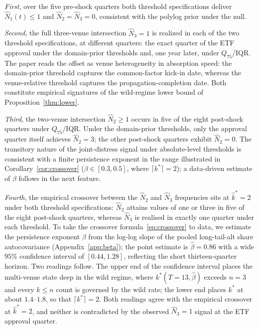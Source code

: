 \documentclass[12pt]{article}
\theoremstyle{sampledef}
\theoremstyle{sampleplain}
\theoremstyle{sampleremark}
\newcommand{\1}{\mathbf{1}}
\begin{document}
\emph{First}, over the five pre-shock quarters both threshold
specifications deliver $\hat N_1(t) \le 1$ and $\hat N_2 = \hat N_3
= 0$, consistent with the polylog prior under the null.

\emph{Second}, the full three-venue intersection $\hat N_3 = 1$ is
realized in each of the two threshold specifications, at different
quarters: the exact quarter of the ETF approval under the
domain-prior thresholds and, one year later, under $Q_{75}$/IQR.
The paper reads the offset as venue heterogeneity in absorption
speed: the domain-prior threshold captures the common-factor
kick-in date, whereas the venue-relative threshold captures the
propagation-completion date. Both constitute empirical signatures
of the wild-regime lower bound of Proposition~\ref{thm:lower}.

\emph{Third}, the two-venue intersection $\hat N_2 \ge 1$ occurs in
five of the eight post-shock quarters under $Q_{75}$/IQR. Under the
domain-prior thresholds, only the approval quarter itself achieves
$\hat N_2 = 3$; the other post-shock quarters exhibit
$\hat N_2 = 0$. The transitory nature of the joint-distress signal
under absolute-level thresholds is consistent with a
finite persistence exponent in the range illustrated in
Corollary~\ref{cor:crossover} ($\beta \in [0.3, 0.5]$, where
$\lceil k^\ast\rceil = 2$); a data-driven estimate of $\beta$
follows in the next feature.

\emph{Fourth}, the empirical crossover between the $\hat N_2$ and
$\hat N_3$ frequencies sits at $\hat k^\ast = 2$ under both
threshold specifications: $\hat N_2$ attains values of one or three
in five of the eight post-shock quarters, whereas $\hat N_3$ is realised
in exactly one quarter under each threshold. To take the crossover
formula~\eqref{eq:crossover} to data, we estimate the persistence
exponent $\beta$ from the log-log slope of the pooled long-tail-alt
share autocovariance (Appendix~\ref{app:beta}); the point estimate
is $\hat\beta = 0.86$ with a wide $95\%$ confidence interval of
$[0.44, 1.28]$, reflecting the short thirteen-quarter horizon.
Two readings follow. The upper end of the confidence interval
places the multi-venue state deep in the wild regime, where
$k^\ast(T=13, \hat\beta)$ exceeds $n=3$ and every $k\le n$ count
is governed by the wild rate; the lower end places $k^\ast$ at
about $1.4$--$1.8$, so that $\lceil k^\ast\rceil = 2$. Both
readings agree with the empirical crossover at
$\hat k^\ast = 2$, and neither is contradicted by the observed
$\hat N_3 = 1$ signal at the ETF approval quarter.
\end{document}
